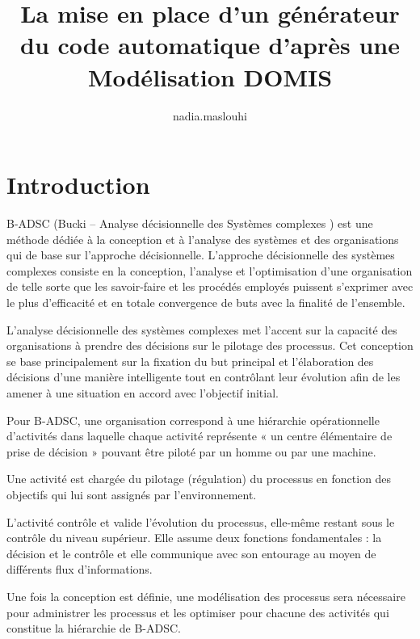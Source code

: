 \documentclass[a4paper,12pt]{article}
\title{La mise en place d'un générateur du code automatique d’après une Modélisation DOMIS}
\author{nadia.maslouhi }
\begin{document}
\maketitle

\vspace{1cm}

\section{Introduction}

\vspace{1cm}
B-ADSC (Bucki – Analyse décisionnelle des Systèmes complexes )  est une méthode dédiée à la conception et à l’analyse des systèmes et des organisations qui de base sur l’approche décisionnelle.
L'approche décisionnelle des systèmes complexes consiste en la conception, l'analyse et l'optimisation d'une organisation de telle sorte que les savoir-faire et les procédés employés puissent s’exprimer avec le plus d'efficacité et en totale convergence de buts avec la finalité de l'ensemble.

\vspace{0,5cm}

L'analyse décisionnelle des systèmes complexes met l'accent sur la capacité des organisations à prendre des décisions sur le pilotage des processus. 
Cet conception se base principalement sur la fixation du but principal et l’élaboration des décisions d’une manière intelligente tout en contrôlant leur évolution afin de les amener à une situation en accord avec l’objectif initial.

\vspace{0,5cm}

Pour B-ADSC, une organisation correspond à une hiérarchie opérationnelle d’activités dans laquelle chaque activité représente « un centre élémentaire de prise de décision » pouvant être piloté par un homme ou par une machine.

Une activité est chargée du pilotage (régulation) du processus en fonction des objectifs qui lui sont assignés par l'environnement.

L'activité contrôle et valide l'évolution du processus, elle-même restant sous le contrôle du niveau supérieur.  Elle assume deux fonctions fondamentales : la décision et le contrôle et elle communique avec son entourage au moyen de différents flux d’informations.

\vspace{0,5cm}

Une fois la conception est définie, une modélisation des processus sera nécessaire pour administrer les processus et les optimiser pour chacune des activités qui constitue la hiérarchie de B-ADSC.
\end{document}
